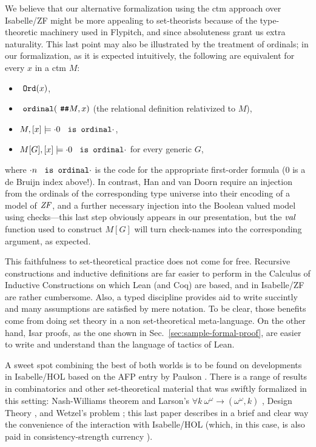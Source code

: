 We believe that our alternative formalization using the ctm approach
over Isabelle/ZF might be more appealing to set-theorists because of the
type-theoretic machinery used in Flypitch, and %
since absoluteness grant us extra naturality. This last point may also
be illustrated by the treatment of ordinals; in our formalization, as
it is expected intuitively, the following are equivalent for every $x$
in a ctm $M$:
\begin{itemize}
\item $\isatt{Ord}(x)$,
\item $\isatt{ordinal}(\isatt{\#\#}M,x)$ (the relational
  definition relativized to $M$),
\item
  $M,[x] \models {\cdot}0\isatt{ is ordinal}{\cdot}$,
\item
  $M[G], [x] \models {\cdot}0\isatt{ is ordinal}{\cdot}$ for every generic $G$,
\end{itemize}
where ${\cdot}n\isatt{ is ordinal}{\cdot}$ is the code for the
appropriate first-order formula  ($0$ is a de
Bruijn index above!). In contrast, Han and van Doorn require an
injection from the ordinals of the corresponding type universe into
their encoding of a model of $\mathit{ZF}$, and a further necessary injection into the Boolean
valued model using checks---this last step obviously appears in our
presentation, but the $\operatorname{\mathit{val}}$ function used to construct $M[G]$ will turn
check-names into the corresponding argument, as expected.

This faithfulness to set-theoretical practice does not come for
free. Recursive constructions and inductive definitions are far easier
to perform in the Calculus of Inductive Constructions on which Lean
(and Coq) are based, and in Isabelle/ZF are rather cumbersome. Also, a
typed discipline provides aid to write succintly and many assumptions
are satisfied by mere notation. To be clear, those benefits come from
doing set theory in a non set-theoretical meta-language. On the other
hand, Isar proofs, as the one shown in
Sec.~\ref{sec:sample-formal-proof}, are easier to write and understand
than the language of tactics of Lean.

A sweet spot combining the best of both worlds is to be found on
developments in Isabelle/HOL based on the AFP entry
 by Paulson \cite{ZFC_in_HOL-AFP}. There is a
range of results in combinatorics and other set-theoretical material
that was swiftly formalized in this setting: Nash-Williams theorem and
Larson's $\forall k\ \omega^{\omega}\longrightarrow(\omega^\omega,k)$
\cite{doi:10.1080/10586458.2021.1980464}, Design Theory
\cite{10.1007/978-3-030-81097-9_1}, and Wetzel's problem
\cite{2022arXiv220503159P}; this last paper describes in a brief and
clear way the convenience of the interaction with Isabelle/HOL
(which, in this case, is also paid in consistency-strength currency
\cite[Sect.~3]{DBLP:conf/ictac/Obua06}).

